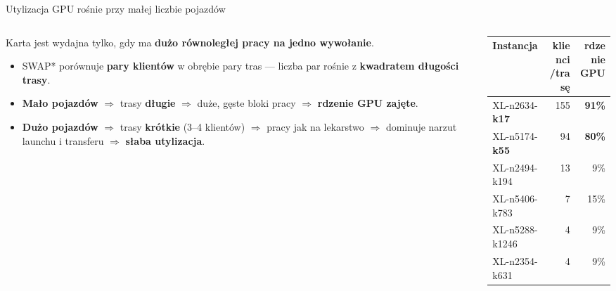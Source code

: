 \documentclass[aspectratio=169,11pt]{beamer}
\newcommand{\good}[1]{\textcolor{good}{\textbf{#1}}}
\newcommand{\bad}[1]{\textcolor{bad}{\textbf{#1}}}
\begin{document}
\begin{frame}{Utylizacja GPU rośnie przy małej liczbie pojazdów}
  \begin{columns}[T]
    \begin{column}{0.56\textwidth}
      Karta jest wydajna tylko, gdy ma \textbf{dużo równoległej pracy na jedno wywołanie}.
      \vspace{0.4em}
      \begin{itemize}
        \item SWAP* porównuje \textbf{pary klientów} w obrębie pary tras — liczba par rośnie z \textbf{kwadratem długości trasy}.
        \item \textbf{Mało pojazdów} $\Rightarrow$ trasy \textbf{długie} $\Rightarrow$ duże, gęste bloki pracy $\Rightarrow$ \good{rdzenie GPU zajęte}.
        \item \textbf{Dużo pojazdów} $\Rightarrow$ trasy \textbf{krótkie} (3--4 klientów) $\Rightarrow$ pracy jak na lekarstwo $\Rightarrow$ dominuje narzut launchu i transferu $\Rightarrow$ \bad{słaba utylizacja}.
      \end{itemize}
    \end{column}
    \begin{column}{0.44\textwidth}
      \centering
      \scriptsize
      \begin{tabular}{l r r}
        \toprule
        Instancja & \makecell{klienci\\/trasę} & \makecell{rdzenie\\GPU} \\
        \midrule
        XL-n2634-\textbf{k17}  & 155 & \good{91\%} \\
        XL-n5174-\textbf{k55}  & 94  & \good{80\%} \\
        XL-n2494-k194          & 13  & 9\% \\
        XL-n5406-k783          & 7   & 15\% \\
        XL-n5288-k1246         & 4   & 9\% \\
        XL-n2354-k631          & 4   & 9\% \\
        \bottomrule
      \end{tabular}
      \par\vspace{0.4em}{\tiny ,,k'' w nazwie = liczba pojazdów; średnia długość trasy $= n/k$.}
    \end{column}
  \end{columns}
\end{frame}

\end{document}

